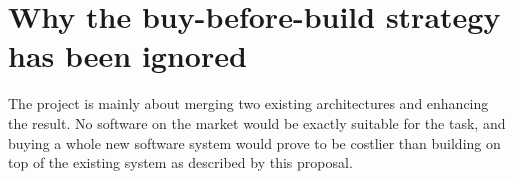 \section{Why the buy-before-build strategy has been ignored}

The project is mainly about merging two existing architectures and enhancing
the result. No software on the market would be exactly suitable for the task,
and buying a whole new software system would prove to be costlier than
building on top of the existing system as described by this proposal.